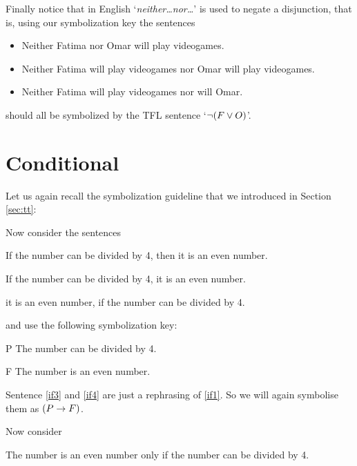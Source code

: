 Finally notice that in English `\emph{neither\ldots nor\ldots}' is used to negate a disjunction, that is, using our symbolization key the sentences
\begin{itemize}
\item Neither Fatima nor Omar will play videogames.
\item Neither Fatima will play videogames nor Omar will play videogames.
\item  Neither Fatima will play videogames nor will Omar.
\end{itemize}
should all be symbolized by the TFL sentence `$\neg(F\vee O)$'.



\section{Conditional}
Let us again recall the symbolization guideline that we introduced in Section \ref{sec:tt}:


\noindent Now consider the sentences
\begin{earg}
	\item[\ex{if1}] If the number can be divided by 4, then it is an even number.
		\item[\ex{if3}] If the number can be divided by 4, it is an even number.
		\item[\ex{if4}] it is an even number, if the number can be divided by 4.
\end{earg}

and use the following symbolization key:
	\begin{ekey}
		\item[P] The number can be divided by 4.
		\item[F] The number is an even number.
	\end{ekey}
Sentence \ref{if3} and \ref{if4} are just a rephrasing of \ref{if1}. So we will again symbolise them as $(P\rightarrow F)$.

Now consider
\begin{earg}
		\item[\ex{if2}] The number is an even number only if the number can be divided by 4.
\end{earg}

